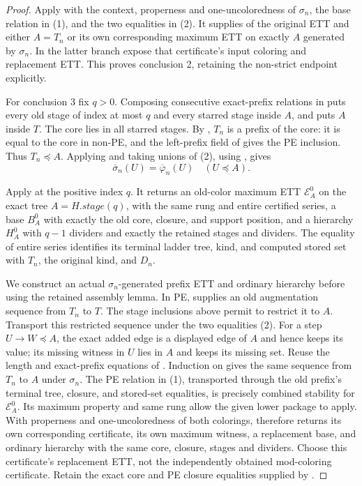 \begin{proof}
Apply  with the context,
properness and one-uncoloredness of $\sigma_n$, the base relation
in (1), and the two equalities in (2).
It supplies  of the original ETT and either $A=T_n$
or its own corresponding maximum ETT on exactly $A$ generated by
$\sigma_n$.  In the latter branch expose that certificate's input
coloring and replacement ETT.  This proves conclusion 2, retaining the
non-strict endpoint explicitly.

For conclusion 3 fix $q>0$.  Composing consecutive exact-prefix
relations in  puts every old stage of index
at most $q$ and every starred stage inside $A$, and puts $A$ inside $T$.
The core lies in all starred stages.  By ,
$T_n$ is a prefix of the core: it is equal to the core in non-PE, and the
left-prefix field of  gives the PE inclusion.
Thus $T_n\preccurlyeq A$.  Applying
 and taking unions
of (2), using , gives
\[
       \overline\sigma_n(U)=\overline\varphi_n(U)
                        \quad(U\preccurlyeq A).                 \tag{3}
\]

Apply  at the positive index $q$.
It returns an old-color maximum ETT $\mathcal E^0_A$ on the exact tree
$A=H.\mathit{stage}(q)$, with the same rung and entire certified series,
a base $B^0_A$ with exactly the old core, closure, and support position,
and a hierarchy $H^0_A$ with $q-1$ dividers and exactly the retained
stages and dividers.  The equality of entire series identifies its
terminal ladder tree, kind, and computed stored set with $T_n$, the
original kind, and $D_n$.

We construct an actual $\sigma_n$-generated prefix ETT and ordinary
hierarchy before using the retained assembly lemma.
In PE,  supplies an old augmentation
sequence from $T_n$ to $T$.  The stage inclusions above permit
 to restrict it to $A$.
Transport this restricted sequence under the two equalities (2).
For a step $U\to W\preccurlyeq A$, the exact added edge is a displayed
edge of $A$ and hence keeps its value; its missing witness in $U$
lies in $A$ and keeps its missing set.  Reuse the length and exact-prefix
equations of .
Induction on  gives the same
sequence from $T_n$ to $A$ under $\sigma_n$.
The PE relation in (1), transported through the old prefix's terminal
tree, closure, and stored-set equalities, is precisely combined stability
for $\mathcal E^0_A$.  Its maximum property and same rung allow the given
lower package to apply.  With properness and one-uncoloredness of both
colorings,  therefore returns its own
corresponding certificate, its own maximum witness, a replacement base,
and ordinary hierarchy with the same core, closure, stages and dividers.
Choose this certificate's replacement ETT, not the independently
obtained mod-coloring certificate.  Retain the exact core and PE closure
equalities supplied by .


\end{proof}
